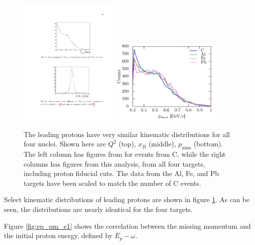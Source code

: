 \documentclass{article}
\begin{document}
\begin{figure}[htpb]
\includegraphics[width=0.43\textwidth]{or_note_figs/pm.pdf}
\includegraphics[width=0.49\textwidth]{leading_dist/leading_Pmiss.pdf}
\caption[Leading proton distributions]{
The leading protons have very similar kinematic distributions for all four nuclei.
Shown here are $Q^2$ (top), $x_B$ (middle), $p_\text{miss}$ (bottom). The left column
has figures from \cite{Or:note} for events from C, while the right columns has figures from this analysis,
from all four targets, including proton fiducial cuts. The data from the Al, Fe, and Pb
targets have been scaled to match the number of C events. 
\label{fig:leading}}
\end{figure}

Select kinematic distributions of leading protons are shown in figure \ref{fig:leading}.
As can be seen, the distributions are nearly identical for the four targets. 


Figure \ref{fig:ep_pm_e1} shows the correlation between the missing momentum and the initial
proton energy, defined by $E_p - \omega$. 
\end{document}
